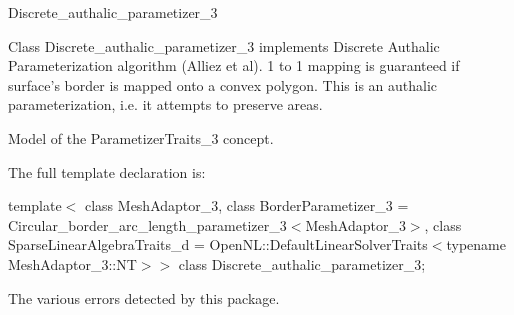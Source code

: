 

\begin{ccRefClass}{Discrete_authalic_parametizer_3}  %


\ccDefinition


Class Discrete\_authalic\_parametizer\_3 implements Discrete Authalic Parameterization algorithm (Alliez et al). 1 to 1 mapping is guaranteed if surface's border is mapped onto a convex polygon. This is an authalic parameterization, i.e. it attempts to preserve areas.



\ccIsModel

Model of the ParametizerTraits\_3 concept.



\ccParameters

The full template declaration is:

template$<$
class MeshAdaptor\_3, 
class BorderParametizer\_3 = Circular\_border\_arc\_length\_parametizer\_3$<$MeshAdaptor\_3$>$, 
class SparseLinearAlgebraTraits\_d = OpenNL::DefaultLinearSolverTraits$<$typename MeshAdaptor\_3::NT$>$$>$ 
class Discrete\_authalic\_parametizer\_3;


\ccTypes


{
}
{
The various errors detected by this package.
}
{
}
{
}
{
}
{
}
{
}
{
}
{
}
{
}
{
}
{
}
{
}
{
}
{
}
{
}
{
}
{
}
{
}
{
}
{
}
{
}
{
}
{
}
{
}
{
}



\end{ccRefClass}
